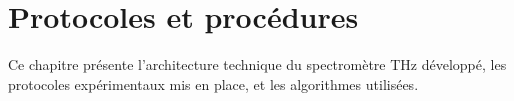 
\chapter{Protocoles et procédures}
\label{chap:protocoles}

Ce chapitre présente l'architecture technique du spectromètre THz développé, les protocoles expérimentaux mis en place, et les algorithmes utilisées. 







